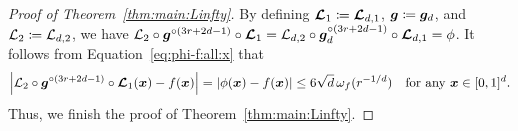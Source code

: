 \documentclass[nohyperref]{article}
\theoremstyle{plain}
\theoremstyle{definition}
\theoremstyle{remark}
\begin{document}
\begin{proof}[Proof of Theorem~\ref{thm:main:Linfty}]
By defining ${\bm{\mathcal{L}}}_1\coloneqq {\bm{\mathcal{L}}}_{d,1}$, ${\bm{g}}\coloneqq{\bm{g}}_d$, and ${\mathcal{L}}_2\coloneqq {\mathcal{L}}_{d,2}$, we have
${\mathcal{L}}_2\circ{\bm{g}}^{\circ (3r+2d-1)}\circ {\bm{\mathcal{L}}}_1={\mathcal{L}}_{d,2}\circ {\bm{g}}_d^{\circ (3r+2d-1)}\circ{\bm{\mathcal{L}}}_{d,1}=\phi$.
It follows from Equation~\eqref{eq:phi-f:all:x} that
\begin{equation*}
	\Big|{\mathcal{L}}_2\circ{\bm{g}}^{\circ (3r+2d-1)}\circ {\bm{\mathcal{L}}}_1({\bm{x}})-f({\bm{x}})\Big|
	=|\phi({\bm{x}})-f({\bm{x}})|\le 6\sqrt{d}\, \omega_f(r^{-1/d})\quad \textnormal{for any ${\bm{x}}\in[0,1]^d$}.
\end{equation*}
Thus, we finish the proof of Theorem~\ref{thm:main:Linfty}.	
%	

\end{proof}
\end{document}
